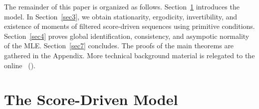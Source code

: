 
The remainder of this paper is organized as follows.
Section~\ref{sec2} introduces the model.
In Section~\ref{sec3}, we obtain stationarity, ergodicity, 
invertibility, and existence of moments of filtered score-driven sequences using primitive conditions. 
Section~\ref{sec4} proves global identification, consistency, and asympotic normality of the MLE.
Section~\ref{sec7} concludes. 
The proofs of the main theorems are gathered in the Appendix. 
More technical background material is relegated to the online \SupplementaryAppendix\ (\SupplementaryAppendixAbbrev).



\section{The Score-Driven Model} %
\label{sec2}


